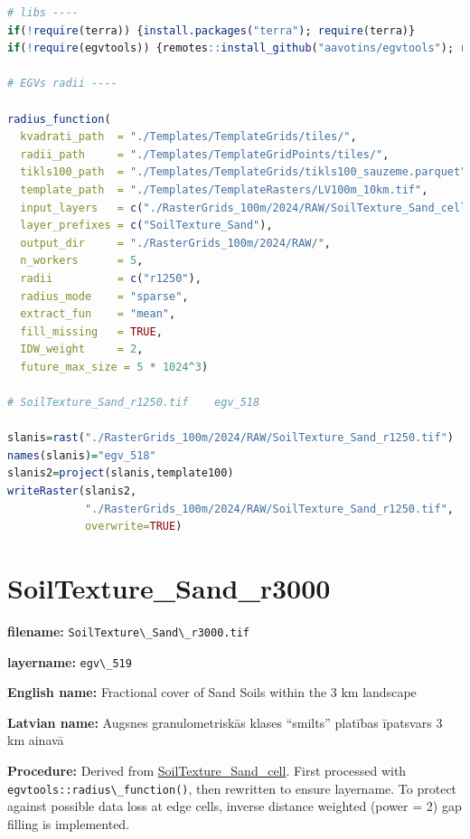 \documentclass[
]{book}
\newcommand{\passthrough}[1]{#1}
\begin{document}
\begin{lstlisting}[language=R]
# libs ----
if(!require(terra)) {install.packages("terra"); require(terra)}
if(!require(egvtools)) {remotes::install_github("aavotins/egvtools"); require(egvtools)}

# EGVs radii ----

radius_function(
  kvadrati_path  = "./Templates/TemplateGrids/tiles/",
  radii_path     = "./Templates/TemplateGridPoints/tiles/",
  tikls100_path  = "./Templates/TemplateGrids/tikls100_sauzeme.parquet",
  template_path  = "./Templates/TemplateRasters/LV100m_10km.tif",
  input_layers   = c("./RasterGrids_100m/2024/RAW/SoilTexture_Sand_cell.tif"),
  layer_prefixes = c("SoilTexture_Sand"),
  output_dir     = "./RasterGrids_100m/2024/RAW/",
  n_workers      = 5,
  radii          = c("r1250"),
  radius_mode    = "sparse",
  extract_fun    = "mean",
  fill_missing   = TRUE,
  IDW_weight     = 2,
  future_max_size = 5 * 1024^3)

# SoilTexture_Sand_r1250.tif    egv_518

slanis=rast("./RasterGrids_100m/2024/RAW/SoilTexture_Sand_r1250.tif")
names(slanis)="egv_518"
slanis2=project(slanis,template100)
writeRaster(slanis2,
            "./RasterGrids_100m/2024/RAW/SoilTexture_Sand_r1250.tif",
            overwrite=TRUE)
\end{lstlisting}

\section{SoilTexture\_Sand\_r3000}\label{ch06.519}

\textbf{filename:} \passthrough{\lstinline!SoilTexture\_Sand\_r3000.tif!}

\textbf{layername:} \passthrough{\lstinline!egv\_519!}

\textbf{English name:} Fractional cover of Sand Soils within the 3 km landscape

\textbf{Latvian name:} Augsnes granulometriskās klases ``smilts'' platības īpatsvars 3 km ainavā

\textbf{Procedure:} Derived from \hyperref[ch06.516]{SoilTexture\_Sand\_cell}. First processed
with \passthrough{\lstinline!egvtools::radius\_function()!}, then rewritten to ensure layername. To protect against
possible data loss at edge cells, inverse distance weighted (power = 2) gap filling
is implemented.
\end{document}

